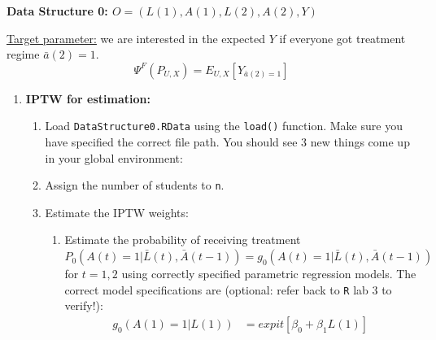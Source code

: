 \documentclass[answers]{exam}
\newenvironment{packed_item}{
\begin{itemize}
 \setlength{\itemsep}{0pt}
  \setlength{\parskip}{0pt}
  \setlength{\parsep}{0pt}
}{\end{itemize}}
\begin{document}
\pagebreak
\noindent\large\textbf{Data Structure 0: $O = (L(1), A(1), L(2), A(2), Y)$}
\normalsize

\noindent \underline{Target parameter:} we are interested in the expected $Y$ if everyone got treatment regime $\bar{a}(2) = 1$.
\[
\Psi^F(P_{U,X}) = E_{U,X}[Y_{\bar{a}(2)=1}]
\]

\begin{enumerate}
\item \textbf{IPTW for estimation:}
\begin{enumerate}
\item Load \texttt{DataStructure0.RData} using the \texttt{load()} function. Make sure you have specified the correct file path. You should see 3 new things come up in your global environment:
\item Assign the number of students to \texttt{n}.
\item Estimate the IPTW weights:
\begin{enumerate}
\item Estimate the probability of receiving treatment $P_0(A(t)=1|\bar{L}(t), \bar{A}(t-1)) = g_0(A(t)=1|\bar{L}(t), \bar{A}(t-1))$ for $t = 1,2$ using correctly specified parametric regression models. The correct model specifications are (optional: refer back to \texttt{R} lab 3 to verify!):
\begin{align*}
g_0(A(1)=1|L(1)) & = expit[\beta_0 + \beta_1L(1)] \\

\end{align*}
\end{enumerate}
\end{enumerate}
\end{enumerate}
\end{document}
